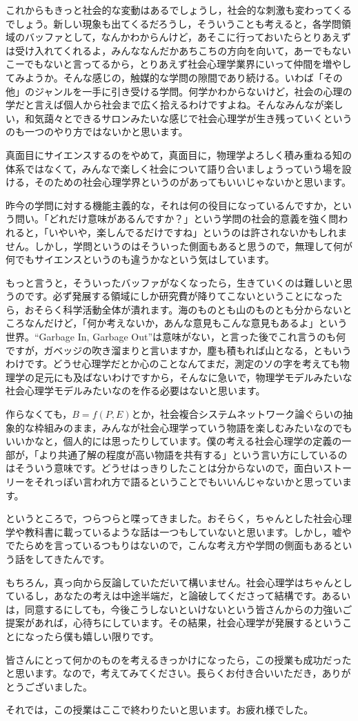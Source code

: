 \documentclass{ltjsbook}
\begin{document}
これからもきっと社会的な変動はあるでしょうし，社会的な刺激も変わってくるでしょう。新しい現象も出てくるだろうし，そういうことも考えると，各学問領域のバッファとして，なんかわからんけど，あそこに行っておいたらとりあえずは受け入れてくれるよ，みんななんだかあちこちの方向を向いて，あーでもないこーでもないと言ってるから，とりあえず社会心理学業界にいって仲間を増やしてみようか。そんな感じの，触媒的な学問の隙間であり続ける。いわば「その他」のジャンルを一手に引き受ける学問。何学かわからないけど，社会の心理の学だと言えば個人から社会まで広く拾えるわけですよね。そんなみんなが楽しい，和気藹々とできるサロンみたいな感じで社会心理学が生き残っていくというのも一つのやり方ではないかと思います。

真面目にサイエンスするのをやめて，真面目に，物理学よろしく積み重ねる知の体系ではなくて，みんなで楽しく社会について語り合いましょうっていう場を設ける，そのための社会心理学界というのがあってもいいじゃないかと思います。

昨今の学問に対する機能主義的な，それは何の役目になっているんですか，という問い。「どれだけ意味があるんですか？」という学問の社会的意義を強く問われると，「いやいや，楽しんでるだけですね」というのは許されないかもしれません。しかし，学問というのはそういった側面もあると思うので，無理して何が何でもサイエンスというのも違うかなという気はしています。

もっと言うと，そういったバッファがなくなったら，生きていくのは難しいと思うのです。必ず発展する領域にしか研究費が降りてこないということになったら，おそらく科学活動全体が潰れます。海のものとも山のものとも分からないところなんだけど，「何か考えないか，あんな意見もこんな意見もあるよ」という世界。``Garbage In, Garbage Out''は意味がない，と言った後でこれ言うのも何ですが，ガベッジの吹き溜まりと言いますか，塵も積もれば山となる，ともいうわけです。どうせ心理学だとか心のことなんてまだ，測定のソの字を考えても物理学の足元にも及ばないわけですから，そんなに急いで，物理学モデルみたいな社会心理学モデルみたいなのを作る必要はないと思います。

作らなくても，$B=f(P,E)$とか，社会複合システムネットワーク論ぐらいの抽象的な枠組みのまま，みんなが社会心理学っていう物語を楽しむみたいなのでもいいかなと，個人的には思ったりしています。僕の考える社会心理学の定義の一部が，「より共通了解の程度が高い物語を共有する」という言い方にしているのはそういう意味です。どうせはっきりしたことは分からないので，面白いストーリーをそれっぽい言われ方で語るということでもいいんじゃないかと思っています。

というところで，つらつらと喋ってきました。おそらく，ちゃんとした社会心理学や教科書に載っているような話は一つもしていないと思います。しかし，嘘やでたらめを言っているつもりはないので，こんな考え方や学問の側面もあるという話をしてきたんです。

もちろん，真っ向から反論していただいて構いません。社会心理学はちゃんとしているし，あなたの考えは中途半端だ，と論破してくださって結構です。あるいは，同意するにしても，今後こうしないといけないという皆さんからの力強いご提案があれば，心待ちにしています。その結果，社会心理学が発展するということになったら僕も嬉しい限りです。

皆さんにとって何かのものを考えるきっかけになったら，この授業も成功だったと思います。なので，考えてみてください。長らくお付き合いいただき，ありがとうございました。

それでは，この授業はここで終わりたいと思います。お疲れ様でした。
\end{document}
